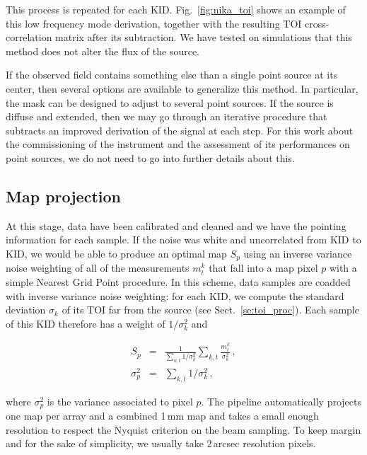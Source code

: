 This process is repeated for each KID. Fig.~\ref{fig:nika_toi} shows an example
of this low frequency mode derivation, together with the resulting TOI
cross-correlation matrix after its subtraction. We have tested on simulations
that this method does not alter the flux of the
source. 

If the observed field contains something else than a single point source at its
center, then several options are available to generalize this method. In
particular, the mask can be designed to adjust to several point sources. If the
source is diffuse and extended, then we may go through an iterative procedure that
subtracts an improved derivation of the signal at each step. For this work about
the commissioning of the instrument and the assessment of its performances on
point sources, we do not need to go into further details about this.

\subsection{Map projection}
\label{se:map_projection}

At this stage, data have been calibrated and cleaned and we have the pointing
information for each sample. If the noise was white and uncorrelated from KID to
KID, we would be able to produce an optimal map $S_p$ using an inverse
variance noise weighting of all of the measurements $m^k_t$ that fall
into a map pixel $p$ with a simple Nearest Grid Point procedure. In
this scheme, data samples are coadded with inverse variance noise
weighting: for each KID, we compute the standard deviation
$\sigma_k$ of its TOI far from the source (see Sect.~\ref{se:toi_proc}). Each
sample of this KID therefore has a weight of $1/\sigma_k^2$ and

\begin{eqnarray}
S_p        &=& \frac{1}{\sum_{k,t}1/\sigma_k^2}\sum_{k,t} \frac{m^k_t}{\sigma_k^2}\,, \label{eq:ngp_sum}\\
\sigma^2_p &=& \sum_{k,t}1/\sigma_k^2\,, \label{eq:ngp_var}
\end{eqnarray}

where $\sigma^2_p$ is the variance associated to pixel $p$. The
pipeline automatically projects one map per array and a combined 1\,mm
map and takes a small enough resolution to respect the Nyquist
criterion on the beam sampling.
To keep margin
and for the sake of simplicity, we usually take 2\,arcsec resolution pixels.

